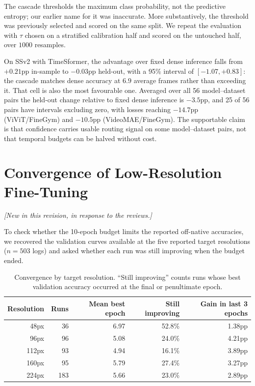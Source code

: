 \documentclass[runningheads]{llncs}
\newcommand{\tabtight}{\setlength{\tabcolsep}{3.5pt}\renewcommand{\arraystretch}{1.12}}
\newcommand{\rev}[1]{\textcolor{revblue}{#1}}
\newcommand{\revnote}{\noindent\textcolor{revblue}{\small\itshape
  [New in this revision, in response to the reviews.]}\par\vspace{2pt}}
\begin{document}
The cascade thresholds the maximum class probability, not the predictive
entropy; our earlier name for it was inaccurate. More substantively, the
threshold was previously selected and scored on the same split. We repeat the
evaluation with $\tau$ chosen on a stratified calibration half and scored on the
untouched half, over $1000$ resamples.

On SSv2 with TimeSformer, the advantage over fixed dense inference falls from
$+0.21$pp in-sample to $-0.03$pp held-out, with a 95\% interval of
$[-1.07,+0.83]$: the cascade matches dense accuracy at $6.9$ average frames
rather than exceeding it. That cell is also the most favourable one. Averaged
over all 56 model--dataset pairs the held-out change relative to fixed dense
inference is $-3.5$pp, and 25 of 56 pairs have intervals excluding zero, with
losses reaching $-14.7$pp (ViViT/FineGym) and $-10.5$pp (VideoMAE/FineGym). The
supportable claim is that confidence carries usable routing signal on some
model--dataset pairs, not that temporal budgets can be halved without cost.

\section{\rev{Convergence of Low-Resolution Fine-Tuning}}
\revnote
\label{sec:sup_convergence}

To check whether the 10-epoch budget limits the reported off-native accuracies,
we recovered the validation curves available at the five reported target resolutions
($n{=}503$ logs) and asked whether each run was still improving when the budget
ended.

\begin{table}[!htbp]
\centering
\caption{Convergence by target resolution. ``Still improving'' counts runs whose
best validation accuracy occurred at the final or penultimate epoch.}
\label{tab:sup_convergence}
\scriptsize\tabtight
\begin{tabular}{r r r r r}
\toprule
Resolution & Runs & Mean best epoch & Still improving & Gain in last 3 epochs \\
\midrule
48px  &  36 & 6.97 & 52.8\% & 1.38pp \\
96px  &  96 & 5.08 & 24.0\% & 4.21pp \\
112px &  93 & 4.94 & 16.1\% & 3.89pp \\
160px &  95 & 5.79 & 27.4\% & 3.27pp \\
224px & 183 & 5.66 & 23.0\% & 2.89pp \\
\bottomrule
\end{tabular}
\end{table}
\end{document}
